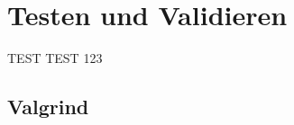 
\chapter{Testen und Validieren}
\label{chapter_Testen_und_Validieren}

TEST TEST 123

\section{Valgrind}
